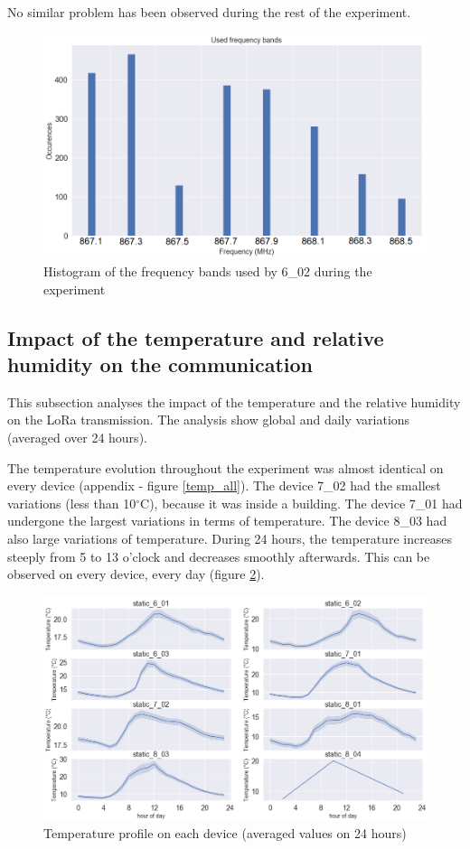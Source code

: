 \documentclass[letterpaper, 10 pt, conference]{ieeeconf}  %
\begin{document}
No similar problem has been observed during the rest of the experiment.

\begin{figure}[htbp]
\centering
\includegraphics[scale=0.33]{6_02_freq_hist.png}
\caption{Histogram of the frequency bands used by 6\_02 during the experiment}
\label{602_freq_hist}
\end{figure}

\subsection{Impact of the temperature and relative humidity on the communication}

This subsection analyses the impact of the temperature and the relative humidity on the LoRa transmission. The analysis show global and daily variations (averaged over 24 hours).

The temperature evolution throughout the experiment was almost identical on every device (appendix - figure \ref{temp_all}). The device 7\_02 had the smallest variations (less than 10$^\circ$C), because it was inside a building. The device 7\_01 had undergone the largest variations in terms of temperature. The device 8\_03 had also large variations of temperature. During 24 hours, the temperature increases steeply from 5 to 13 o'clock and decreases smoothly afterwards. This can be observed on every device, every day (figure \ref{temp_24h_all}).

\begin{figure}[htbp]
\centering
\includegraphics[scale=0.25]{02_temp_24h_all.png}
\caption{Temperature profile on each device (averaged values on 24 hours)}
\label{temp_24h_all}
\end{figure}
\end{document}
